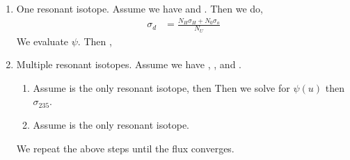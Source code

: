 \documentclass{school-22.211-notes}
\begin{document}
\clearpage
{}
\begin{enumerate}
\item One resonant isotope. Assume we have  and . Then we do, 
\begin{align}
\sigma_d &= \frac{N_H \sigma_H + N_0 \sigma_o}{N_U} 
\end{align}
We evaluate $\psi$. Then ,

\item Multiple resonant isotopes. Assume we have , , and . 
  \begin{enumerate}
  \item Assume  is the only resonant isotope, then 
    Then we solve for $\psi(u)$ then $\sigma_{235}$. 
  \item Assume  is the only resonant isotope. 
  \end{enumerate}
  We repeat the above steps until the flux converges. 
\end{enumerate}
\end{document}
